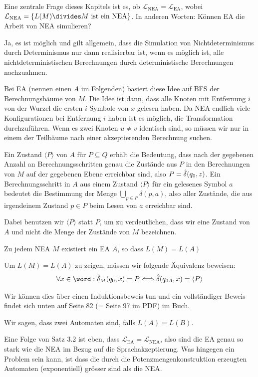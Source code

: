 Eine zentrale Frage dieses Kapitels ist es, ob $\mathcal{L}_{\text{NEA}} = \mathcal{L}_{\text{EA}}$, wobei $\mathcal{L}_{\text{NEA}} = \{ L(M) \divides M \text{ ist ein NEA} \}$.
In anderen Worten: Können EA die Arbeit von NEA simulieren? 

Ja, es ist möglich und gilt allgemein, dass die Simulation von Nichtdeterminismus durch Determinismus nur dann realisierbar ist, 
wenn es möglich ist, alle nichtdeterministischen Berechnungen durch deterministische Berechnungen nachzuahmen.

Bei EA (nennen einen $A$ im Folgenden) basiert diese Idee auf BFS der Berechnungsbäume von $M$.
Die Idee ist dann, dass alle Knoten mit Entfernung $i$ von der Wurzel die ersten $i$ Symbole von $x$ gelesen haben.
Da NEA endlich viele Konfigurationen bei Entfernung $i$ haben ist es möglich, die Transformation durchzuführen.
Wenn es zwei Knoten $u \neq v$ identisch sind, so müssen wir nur in einem der Teilbäume nach einer akzeptierenden Berechnung suchen.

 Ein Zustand $\langle P \rangle$ von $A$ für $P \subseteq Q$ erhält die Bedeutung,
dass nach der gegebenen Anzahl an Berechnungsschritten genau die Zustände aus $P$ in den Berechnungen von $M$ auf der gegebenen Ebene erreichbar sind, also $P = \hat{\delta}(q_0, z)$.
Ein Berechnungsschritt in $A$ aus einem Zustand $\langle P \rangle$ für ein gelesenes Symbol $a$ bedeutet die Bestimmung der Menge $\bigcup_{p \in P} \delta(p, a)$, 
also aller Zustände, die aus irgendeinem Zustand $p \in P$ beim Lesen von $a$ erreichbar sind.

Dabei benutzen wir $\langle P \rangle$ statt $P$, um zu verdeutlichen, dass wir eine Zustand von $A$ und nicht die Menge der Zustände von $M$ bezeichnen.

\inlinetheorem Zu jedem NEA $M$ existiert ein EA $A$, so dass $L(M) = L(A)$

Um $L(M) = L(A)$ zu zeigen, müssen wir folgende Äquivalenz beweisen:
\rmvspace
\begin{align*}
    \forall x \in \word : \hdelta_M(q_0, x) = P \Longleftrightarrow \hdelta(q_{0 A}, x) = \langle P \rangle
\end{align*}

\rmvspace
Wir können dies über einen Induktionsbeweis tun und ein vollständiger Beweis findet sich unten auf Seite 82 (= Seite 97 im PDF) im Buch.

Wir sagen, dass zwei Automaten  sind, falls $L(A) = L(B)$.

Eine Folge von Satz 3.2 ist eben, dass $\mathcal{L}_{\text{EA}} = \mathcal{L}_{\text{NEA}}$, also sind die EA genau so stark wie die NEA im Bezug auf die Sprachakzeptierung.
Was hingegen ein Problem sein kann, ist dass die durch die Potenzmengenkonstruktion erzeugten Automaten (exponentiell) grösser sind als die NEA.

